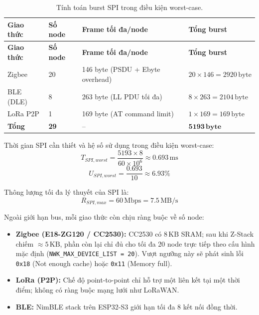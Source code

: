         \begin{longtable}{|p{3cm}|p{2cm}|p{3.5cm}|p{4.5cm}|}
            \caption{Tính toán burst SPI trong điều kiện worst-case.} \label{tab:spi_worst} \\
            \hline
            \textbf{Giao thức} & \textbf{Số node} & \textbf{Frame tối đa/node} & \textbf{Tổng burst} \\ \hline
            \endfirsthead
            \hline
            \textbf{Giao thức} & \textbf{Số node} & \textbf{Frame tối đa/node} & \textbf{Tổng burst} \\ \hline
            \endhead
            \hline
            \endfoot
            \endlastfoot
            Zigbee   & 20 & 146 byte (PSDU + Ebyte overhead) & $20 \times 146 = 2920\,\text{byte}$ \\ \hline
            BLE (DLE) & 8  & 263 byte (LL PDU tối đa)         & $8 \times 263 = 2104\,\text{byte}$  \\ \hline
            LoRa P2P & 1  & 169 byte (AT command limit)       & $1 \times 169 = 169\,\text{byte}$   \\ \hline
            \textbf{Tổng} & \textbf{29} & -- & $\mathbf{5193\,\text{byte}}$ \\ \hline
        \end{longtable}
        
        Thời gian SPI cần thiết và hệ số sử dụng trong điều kiện worst-case:
        \[ T_{SPI,worst} = \dfrac{5193 \times 8}{60 \times 10^6} \approx 0{.}693\,\text{ms} \]
        \[ U_{SPI,worst} = \dfrac{0{.}693}{10} \approx 6{.}93\% \]
        
        Thông lượng tối đa lý thuyết của SPI là:
        \[ R_{SPI,max} = 60\,\text{Mbps} = 7{.}5\,\text{MB/s} \]
        
        Ngoài giới hạn bus, mỗi giao thức còn chịu ràng buộc về số node:
        
        \begin{itemize}
            \item \textbf{Zigbee (E18-ZG120 / CC2530):} CC2530 có $8\,\text{KB}$ SRAM; sau khi Z-Stack chiếm $\approx 5\,\text{KB}$, phần còn lại chỉ đủ cho tối đa 20 node trực tiếp theo cấu hình mặc định (\texttt{NWK\_MAX\_DEVICE\_LIST = 20}). Vượt ngưỡng này sẽ phát sinh lỗi \texttt{0x18} (Not enough cache) hoặc \texttt{0x11} (Memory full).
            \item \textbf{LoRa (P2P):} Chế độ point-to-point chỉ hỗ trợ một liên kết tại một thời điểm; không có ràng buộc mạng lưới như LoRaWAN.
            \item \textbf{BLE:} NimBLE stack trên ESP32-S3 giới hạn tối đa 8 kết nối đồng thời.
        \end{itemize}
        
